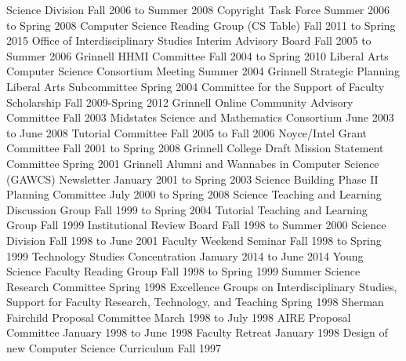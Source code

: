 \begin{cventries}
  {Science Division}
  {Fall 2006 to Summer 2008}
  {Copyright Task Force}
  {Summer 2006 to Spring 2008}
  {Computer Science Reading Group (CS Table)}
  {Fall 2011 to Spring 2015}
  {Office of Interdisciplinary Studies Interim Advisory Board}
  {Fall 2005 to Summer 2006}
  {Grinnell HHMI Committee}
  {Fall 2004 to Spring 2010}
  {Liberal Arts Computer Science Consortium Meeting}
  {Summer 2004}
  {Grinnell Strategic Planning Liberal Arts Subcommittee}
  {Spring 2004}
  {Committee for the Support of Faculty Scholarship}
  {Fall 2009-Spring 2012}
  {Grinnell Online Community Advisory Committee}
  {Fall 2003}
  {Midstates Science and Mathematics Consortium}
  {June 2003 to June 2008}
  {Tutorial Committee}
  {Fall 2005 to Fall 2006}
  {Noyce/Intel Grant Committee}
  {Fall 2001 to Spring 2008}
  {Grinnell College Draft Mission Statement Committee}
  {Spring 2001}
  {Grinnell Alumni and Wannabes in Computer Science (GAWCS) Newsletter}
  {January 2001 to Spring 2003}
  {Science Building Phase II Planning Committee}
  {July 2000 to Spring 2008}
  {Science Teaching and Learning Discussion Group}
  {Fall 1999 to Spring 2004}
  {Tutorial Teaching and Learning Group}
  {Fall 1999}
  {Institutional Review Board}
  {Fall 1998 to Summer 2000}
  {Science Division}
  {Fall 1998 to June 2001}
  {Faculty Weekend Seminar}
  {Fall 1998 to Spring 1999}
  {Technology Studies Concentration}
  {January 2014 to June 2014}
  {Young Science Faculty Reading Group}
  {Fall 1998 to Spring 1999}
  {Summer Science Research Committee}
  {Spring 1998}
  {Excellence Groups on Interdisciplinary Studies, Support for Faculty Research, Technology, and Teaching}
  {Spring 1998}
  {Sherman Fairchild Proposal Committee}
  {March 1998 to July 1998}
  {AIRE Proposal Committee}
  {January 1998 to June 1998}
  {Faculty Retreat}
  {January 1998}
  {Design of new Computer Science Curriculum}
  {Fall 1997}

\end{cventries}
